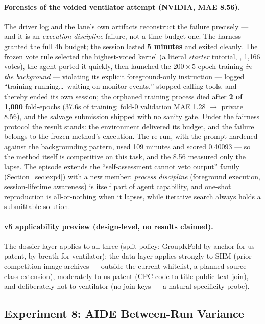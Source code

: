 \documentclass[11pt,a4paper]{article}
\begin{document}
\paragraph{Forensics of the voided ventilator attempt (NVIDIA, MAE 8.56).} The driver log and the lane's own artifacts reconstruct the failure precisely --- and it is an \emph{execution-discipline} failure, not a time-budget one. The harness granted the full 4h budget; the session lasted \textbf{5 minutes} and exited cleanly. The frozen vote rule selected the highest-voted kernel (a literal \emph{starter} tutorial, , 1{,}166 votes), the agent ported it quickly, then launched the $200\times5$-epoch training \emph{in the background} --- violating its explicit foreground-only instruction --- logged ``training running\ldots\ waiting on monitor events,'' stopped calling tools, and thereby ended its own session; the orphaned training process died after \textbf{2 of 1{,}000} fold-epochs (37.6s of training; fold-0 validation MAE 1.28 $\to$ private 8.56), and the salvage submission shipped with no sanity gate. Under the fairness protocol the result stands: the environment delivered its budget, and the failure belongs to the frozen method's execution. The re-run, with the prompt hardened against the backgrounding pattern, used 109 minutes and scored 0.40093 --- so the method itself is competitive on this task, and the 8.56 measured only the lapse. The episode extends the ``self-assessment cannot veto output'' family (Section~\ref{sec:exp4}) with a new member: \emph{process discipline} (foreground execution, session-lifetime awareness) is itself part of agent capability, and one-shot reproduction is all-or-nothing when it lapses, while iterative search always holds a submittable solution.

\paragraph{v5 applicability preview (design-level, no results claimed).} The dossier layer applies to all three (split policy: GroupKFold by anchor for us-patent, by breath for ventilator); the data layer applies strongly to SIIM (prior-competition image archives --- outside the current whitelist, a planned source-class extension), moderately to us-patent (CPC code-to-title public text join), and deliberately not to ventilator (no join keys --- a natural specificity probe).

\subsection{Experiment 8: AIDE Between-Run Variance}
\label{sec:exp8repeat}
\end{document}

